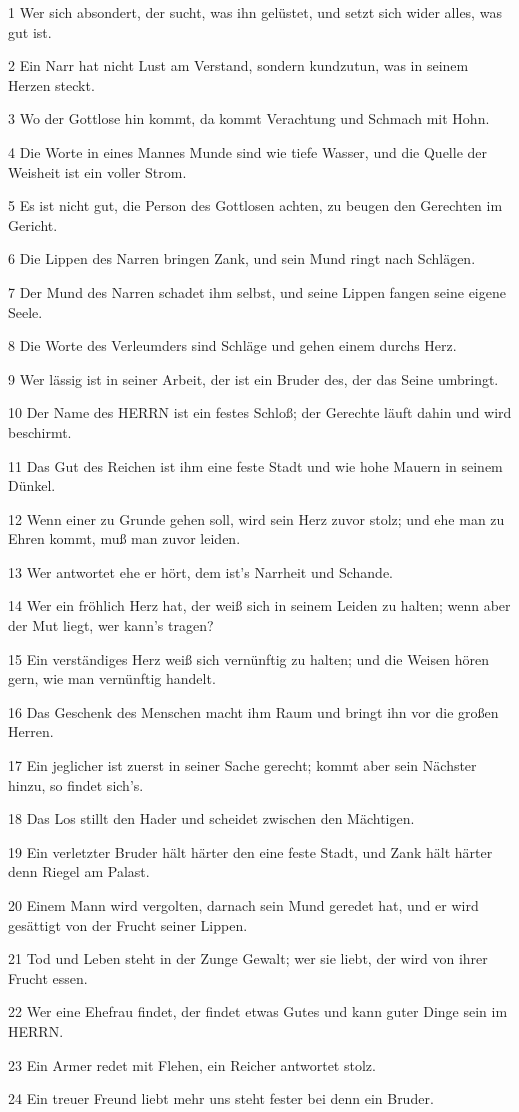 \par 1 Wer sich absondert, der sucht, was ihn gelüstet, und setzt sich wider alles, was gut ist.
\par 2 Ein Narr hat nicht Lust am Verstand, sondern kundzutun, was in seinem Herzen steckt.
\par 3 Wo der Gottlose hin kommt, da kommt Verachtung und Schmach mit Hohn.
\par 4 Die Worte in eines Mannes Munde sind wie tiefe Wasser, und die Quelle der Weisheit ist ein voller Strom.
\par 5 Es ist nicht gut, die Person des Gottlosen achten, zu beugen den Gerechten im Gericht.
\par 6 Die Lippen des Narren bringen Zank, und sein Mund ringt nach Schlägen.
\par 7 Der Mund des Narren schadet ihm selbst, und seine Lippen fangen seine eigene Seele.
\par 8 Die Worte des Verleumders sind Schläge und gehen einem durchs Herz.
\par 9 Wer lässig ist in seiner Arbeit, der ist ein Bruder des, der das Seine umbringt.
\par 10 Der Name des HERRN ist ein festes Schloß; der Gerechte läuft dahin und wird beschirmt.
\par 11 Das Gut des Reichen ist ihm eine feste Stadt und wie hohe Mauern in seinem Dünkel.
\par 12 Wenn einer zu Grunde gehen soll, wird sein Herz zuvor stolz; und ehe man zu Ehren kommt, muß man zuvor leiden.
\par 13 Wer antwortet ehe er hört, dem ist's Narrheit und Schande.
\par 14 Wer ein fröhlich Herz hat, der weiß sich in seinem Leiden zu halten; wenn aber der Mut liegt, wer kann's tragen?
\par 15 Ein verständiges Herz weiß sich vernünftig zu halten; und die Weisen hören gern, wie man vernünftig handelt.
\par 16 Das Geschenk des Menschen macht ihm Raum und bringt ihn vor die großen Herren.
\par 17 Ein jeglicher ist zuerst in seiner Sache gerecht; kommt aber sein Nächster hinzu, so findet sich's.
\par 18 Das Los stillt den Hader und scheidet zwischen den Mächtigen.
\par 19 Ein verletzter Bruder hält härter den eine feste Stadt, und Zank hält härter denn Riegel am Palast.
\par 20 Einem Mann wird vergolten, darnach sein Mund geredet hat, und er wird gesättigt von der Frucht seiner Lippen.
\par 21 Tod und Leben steht in der Zunge Gewalt; wer sie liebt, der wird von ihrer Frucht essen.
\par 22 Wer eine Ehefrau findet, der findet etwas Gutes und kann guter Dinge sein im HERRN.
\par 23 Ein Armer redet mit Flehen, ein Reicher antwortet stolz.
\par 24 Ein treuer Freund liebt mehr uns steht fester bei denn ein Bruder.

